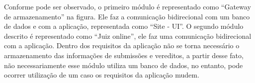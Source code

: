 Conforme pode ser observado, o primeiro módulo é representado como ``Gateway de armazenamento'' na figura. Ele faz a comunicação bidirecional com um banco de dados e com a aplicação, representada como ``Site - UI''. O segundo módulo descrito é representado como ``Juiz online'', ele faz uma comunicação bidirecional com a aplicação. Dentro dos requisitos da aplicação não se torna necessário o armazenamento das informações de submissões e vereditos, a partir desse fato, não necessariamente esse módulo utiliza um banco de dados, no entanto, pode ocorrer utilização de um caso os requisitos da aplicação mudem.